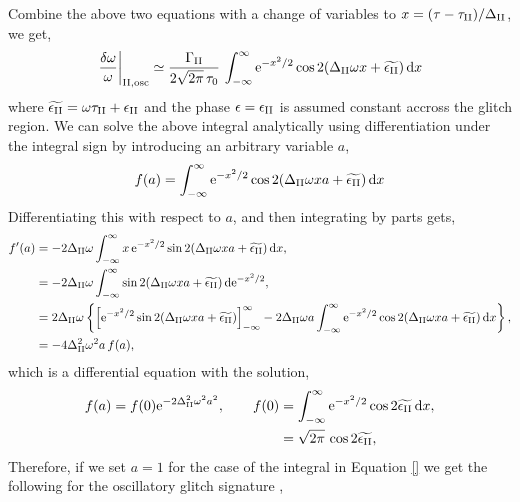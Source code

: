 Combine the above two equations with a change of variables to \(x = (\tau - \tau_{{\mathrm{II}}})/\Delta_{{\mathrm{II}}}\), we get,
%
\begin{equation}
    \left.\frac{\delta\omega}{\omega}\right|_{{\mathrm{II}}, \mathrm{osc}} \simeq \frac{\Gamma_{{\mathrm{II}}}}{2\sqrt{2\pi} \, \tau_0} \, \int_{-\infty}^\infty \mathrm{e}^{- x^2/2} \cos 2 (\Delta_{{\mathrm{II}}} \omega x + \widetilde{\epsilon_{{\mathrm{II}}}}) \, \mathrm{d} x
\end{equation}
%
where \(\widetilde{\epsilon_{{\mathrm{II}}}} = \omega\tau_{{\mathrm{II}}} + \epsilon_{{\mathrm{II}}}\) and the phase \(\epsilon=\epsilon_{{\mathrm{II}}}\) is assumed constant accross the glitch region. We can solve the above integral analytically using differentiation under the integral sign by introducing an arbitrary variable \(a\),
%
\begin{equation}
    f(a) = \int_{-\infty}^\infty \mathrm{e}^{- x^2/2 } \cos 2 (\Delta_{{\mathrm{II}}} \omega x a + \widetilde{\epsilon_{{\mathrm{II}}}}) \, \mathrm{d} x
\end{equation}
%
Differentiating this with respect to \(a\), and then integrating by parts gets,
%
\begin{align}
    f'(a) &= - 2 \Delta_{{\mathrm{II}}} \omega \int_{-\infty}^\infty x \, \mathrm{e}^{- x^2/2 } \sin 2 (\Delta_{{\mathrm{II}}} \omega x a + \widetilde{\epsilon_{{\mathrm{II}}}}) \, \mathrm{d} x, \notag\\
    &= - 2 \Delta_{{\mathrm{II}}} \omega \int_{-\infty}^\infty \sin 2 (\Delta_{{\mathrm{II}}} \omega x a + \widetilde{\epsilon_{{\mathrm{II}}}}) \, \mathrm{d} \mathrm{e}^{- x^2/2 }, \notag\\
    &= 2 \Delta_{{\mathrm{II}}} \omega \left\{ \left[ \mathrm{e}^{- x^2/2 } \sin 2 (\Delta_{{\mathrm{II}}} \omega x a + \widetilde{\epsilon_{{\mathrm{II}}}}) \right]_{-\infty}^\infty - 2 \Delta_{{\mathrm{II}}} \omega a \int_{-\infty}^\infty \mathrm{e}^{- x^2/2 } \cos 2 (\Delta_{{\mathrm{II}}} \omega x a + \widetilde{\epsilon_{{\mathrm{II}}}}) \, \mathrm{d} x \right\}, \notag\\
    &= - 4 \Delta_{{\mathrm{II}}}^2 \omega^2 a \, f(a),
\end{align}
%
which is a differential equation with the solution,
%
\begin{equation}
    \begin{split}
        f(a) = f(0) \mathrm{e}^{- 2 \Delta_{{\mathrm{II}}}^2 \omega^2 a^2}, \qquad f(0) &= \int_{-\infty}^\infty \mathrm{e}^{- x^2/2 } \cos 2 \widetilde{\epsilon_{{\mathrm{II}}}} \, \mathrm{d} x, \\
        &= \sqrt{2\pi} \, \cos 2 \widetilde{\epsilon_{{\mathrm{II}}}},
    \end{split}
\end{equation}
%
Therefore, if we set \(a = 1\) for the case of the integral in Equation \ref{} we get the following for the oscillatory glitch signature \citep[cf.][]{Houdek.Gough2007},
